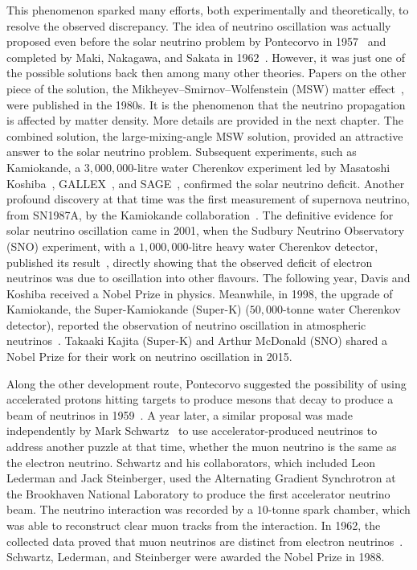 This phenomenon sparked many efforts, both experimentally and theoretically, to resolve the observed discrepancy.
The idea of neutrino oscillation was actually proposed even before the solar neutrino problem by Pontecorvo in 1957~\cite{Pontecorvo:1957qd} and completed by Maki, Nakagawa, and Sakata in 1962~\cite{Maki:1962mu}.
However, it was just one of the possible solutions back then among many other theories.
Papers on the other piece of the solution, the Mikheyev–Smirnov–Wolfenstein (MSW) matter effect~\cite{Wolfenstein:1977ue,Mikheyev:1985zog}, were published in the 1980s.
It is the phenomenon that the neutrino propagation is affected by matter density. More details are provided in the next chapter.
The combined solution, the large-mixing-angle MSW solution, provided an attractive answer to the solar neutrino problem.
Subsequent experiments, such as Kamiokande, a $3,000,000$-litre water Cherenkov experiment led by Masatoshi Koshiba~\cite{Kamiokande-II:1989hkh}, GALLEX~\cite{GALLEX:1998kcz}, and SAGE~\cite{SAGE:1999nng}, confirmed the solar neutrino deficit.
Another profound discovery at that time was the first measurement of supernova neutrino, from SN1987A, by the Kamiokande collaboration~\cite{Kamiokande-II:1987idp}.
The definitive evidence for solar neutrino oscillation came in 2001, when the Sudbury Neutrino Observatory (SNO) experiment, with a $1,000,000$-litre heavy water Cherenkov detector, published its result~\cite{SNO:2001kpb}, directly showing that the observed deficit of electron neutrinos was due to oscillation into other flavours.
The following year, Davis and Koshiba received a Nobel Prize in physics.
Meanwhile, in 1998, the upgrade of Kamiokande, the Super-Kamiokande (Super-K) ($50,000$-tonne water Cherenkov detector), reported the observation of neutrino oscillation in atmospheric neutrinos~\cite{Super-Kamiokande:1998kpq}.
Takaaki Kajita (Super-K) and Arthur McDonald (SNO) shared a Nobel Prize for their work on neutrino oscillation in 2015.

Along the other development route, Pontecorvo suggested the possibility of using accelerated protons hitting targets to produce mesons that decay to produce a beam of neutrinos in 1959~\cite{Pontecorvo:1959sn}.
A year later, a similar proposal was made independently by Mark Schwartz~\cite{Schwartz:1960hg} to use accelerator-produced neutrinos to address another puzzle at that time, whether the muon neutrino is the same as the electron neutrino.
Schwartz and his collaborators, which included Leon Lederman and Jack Steinberger, used the Alternating Gradient Synchrotron at the Brookhaven National Laboratory to produce the first accelerator neutrino beam.
The neutrino interaction was recorded by a $10$-tonne spark chamber, which was able to reconstruct clear muon tracks from the interaction.
In 1962, the collected data proved that muon neutrinos are distinct from electron neutrinos~\cite{Danby:1962nd}.
Schwartz, Lederman, and Steinberger were awarded the Nobel Prize in 1988.

